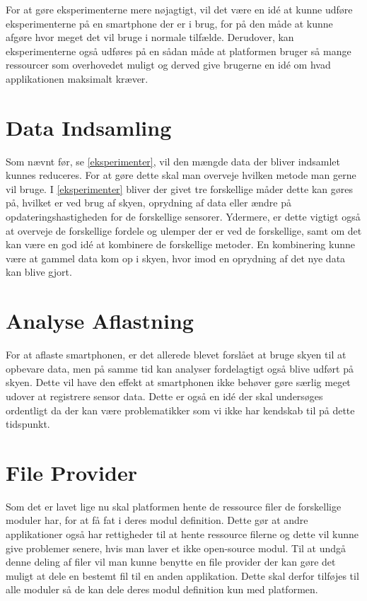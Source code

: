 For at gøre eksperimenterne mere nøjagtigt, vil det være en idé at kunne udføre eksperimenterne på en smartphone der er i brug, for på den måde at kunne afgøre hvor meget det vil bruge i normale tilfælde.
Derudover, kan eksperimenterne også udføres på en sådan måde at platformen bruger så mange ressourcer som overhovedet muligt og derved give brugerne en idé om hvad applikationen maksimalt kræver. 

\section{Data Indsamling}
Som nævnt før, se \cref{eksperimenter}, vil den mængde data der bliver indsamlet kunnes reduceres.
For at gøre dette skal man overveje hvilken metode man gerne vil bruge.
I \cref{eksperimenter} bliver der givet tre forskellige måder dette kan gøres på, hvilket er ved brug af skyen, oprydning af data eller ændre på opdateringshastigheden for de forskellige sensorer.
Ydermere, er dette vigtigt også at overveje de forskellige fordele og ulemper der er ved de forskellige, samt om det kan være en god idé at kombinere de forskellige metoder.
En kombinering kunne være at gammel data kom op i skyen, hvor imod en oprydning af det nye data kan blive gjort.

\section{Analyse Aflastning}
For at aflaste smartphonen, er det allerede blevet forslået at bruge skyen til at opbevare data, men på samme tid kan analyser fordelagtigt også blive udført på skyen. 
Dette vil have den effekt at smartphonen ikke behøver gøre særlig meget udover at registrere sensor data.
Dette er også en idé der skal undersøges ordentligt da der kan være problematikker som vi ikke har kendskab til på dette tidspunkt. 

\section{File Provider}
Som det er lavet lige nu skal platformen hente de ressource filer de forskellige moduler har, for at få fat i deres modul definition.
Dette gør at andre applikationer også har rettigheder til at hente ressource filerne og dette vil kunne give problemer senere, hvis man laver et ikke open-source modul.
Til at undgå denne deling af filer vil man kunne benytte en file provider der kan gøre det muligt at dele en bestemt fil til en anden applikation.
Dette skal derfor tilføjes til alle moduler så de kan dele deres modul definition kun med platformen. 


